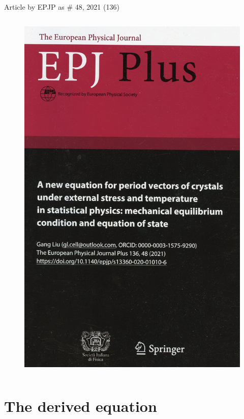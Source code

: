 \documentclass[8pt]{beamer}
\begin{document}
\begin{frame}{Article by EPJP as \# 48, 2021 (136)}
\begin{columns}
      \begin{figure} 
          \includegraphics[width=.6\textwidth]{./img264.jpg}
      \end{figure}
\end{columns}
\end{frame}




\section{The derived equation }
\end{document}
